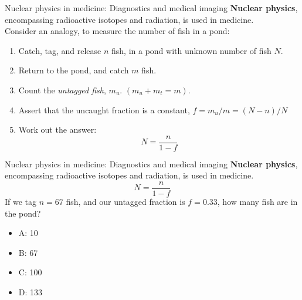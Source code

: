 \documentclass{beamer}
\begin{document}
\begin{frame}{Nuclear physics in medicine: Diagnostics and medical imaging}
\textbf{Nuclear physics}, encompassing radioactive isotopes and radiation, is used in medicine. \\ \vspace{0.5cm}
\small
Consider an analogy, to measure the number of fish in a pond:
\begin{enumerate}
\item Catch, tag, and release $n$ fish, in a pond with unknown number of fish $N$.
\item Return to the pond, and catch $m$ fish.
\item Count the \textit{untagged fish}, $m_u$.  $(m_u + m_t = m)$.
\item Assert that the uncaught fraction is a constant, $f = m_u/m = (N-n)/N$
\item Work out the answer:
\begin{equation}
N = \frac{n}{1-f}
\end{equation}
\end{enumerate}
\end{frame}

\begin{frame}{Nuclear physics in medicine: Diagnostics and medical imaging}
\textbf{Nuclear physics}, encompassing radioactive isotopes and radiation, is used in medicine. \\ \vspace{0.5cm}
\small
\begin{equation}
N = \frac{n}{1-f}
\end{equation}
If we tag $n = 67$ fish, and our untagged fraction is $f = 0.33$, how many fish are in the pond?
\begin{itemize}
\item A: 10
\item B: 67
\item C: 100
\item D: 133
\end{itemize}
\end{frame}
\end{document}

